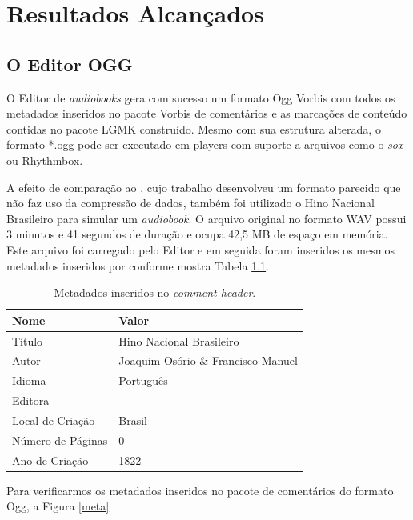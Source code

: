 \chapter[Resultados Alcançados]{Resultados Alcançados}\label{cap4}

\section{O Editor OGG}

O Editor de \textit{audiobooks} gera com sucesso um formato Ogg Vorbis com todos os metadados inseridos no pacote Vorbis de comentários e as marcações de conteúdo contidas no pacote LGMK construído. Mesmo com sua estrutura alterada, o formato *.ogg pode ser executado em players com suporte a arquivos como o \textit{sox} ou Rhythmbox.

A efeito de comparação ao \cite{herbert}, cujo trabalho desenvolveu um formato parecido que não faz uso da compressão de dados, também foi utilizado o Hino Nacional Brasileiro para simular um \textit{audiobook}. O arquivo original no formato WAV possui 3 minutos e 41 segundos de duração e ocupa 42,5 MB de espaço em memória. Este arquivo foi carregado pelo Editor e em seguida foram inseridos os mesmos metadados inseridos por \cite{herbert} conforme mostra Tabela \ref{tab1}.

\begin{table}[ht]
\centering
\caption{Metadados inseridos no \textit{comment header}.}
\vspace{0.5cm}
\begin{tabular}{ll}

\hline
\textbf{Nome} & \textbf{Valor} \\
\hline
Título & Hino Nacional Brasileiro \\
Autor & Joaquim Osório \& Francisco Manuel \\
Idioma & Português \\
Editora & \\
Local de Criação & Brasil \\
Número de Páginas & 0 \\
Ano de Criação & 1822 \\
\hline

\end{tabular}
\label{tab1}
\end{table}

Para verificarmos os metadados inseridos no pacote de comentários do formato Ogg, a Figura \ref{meta}

